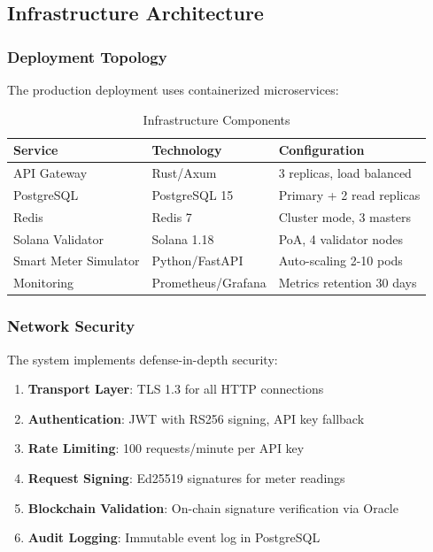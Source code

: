 \documentclass[conference]{IEEEtran}
\begin{document}
\subsection{Infrastructure Architecture}

\subsubsection{Deployment Topology}

The production deployment uses containerized microservices:

\begin{table}[htbp]
\caption{Infrastructure Components}
\begin{center}
\begin{tabular}{llp{6cm}}
\toprule
\textbf{Service} & \textbf{Technology} & \textbf{Configuration} \\
\midrule
API Gateway & Rust/Axum & 3 replicas, load balanced \\
PostgreSQL & PostgreSQL 15 & Primary + 2 read replicas \\
Redis & Redis 7 & Cluster mode, 3 masters \\
Solana Validator & Solana 1.18 & PoA, 4 validator nodes \\
Smart Meter Simulator & Python/FastAPI & Auto-scaling 2-10 pods \\
Monitoring & Prometheus/Grafana & Metrics retention 30 days \\
\bottomrule
\end{tabular}
\label{tab:infrastructure}
\end{center}
\end{table}

\subsubsection{Network Security}

The system implements defense-in-depth security:

\begin{enumerate}
    \item \textbf{Transport Layer}: TLS 1.3 for all HTTP connections
    \item \textbf{Authentication}: JWT with RS256 signing, API key fallback
    \item \textbf{Rate Limiting}: 100 requests/minute per API key
    \item \textbf{Request Signing}: Ed25519 signatures for meter readings
    \item \textbf{Blockchain Validation}: On-chain signature verification via Oracle
    \item \textbf{Audit Logging}: Immutable event log in PostgreSQL
\end{enumerate}
\end{document}
